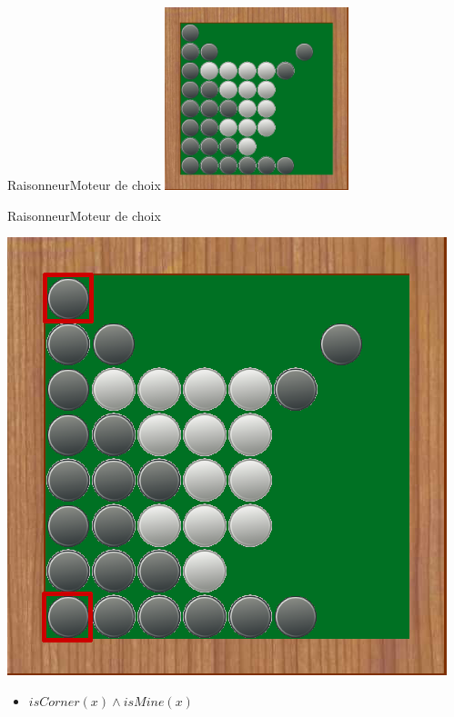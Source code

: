 \begin{frame}{Raisonneur}{Moteur de choix}
	\includegraphics[width=0.4\textwidth]{img/screenshoot/raisonneur_choix_0}	
\end{frame}

\begin{frame}{Raisonneur}{Moteur de choix}
	\begin{minipage}{0.45\textwidth}
		\includegraphics[width=\textwidth]{img/screenshoot/raisonneur_choix_1}
	\end{minipage}
	\begin{minipage}{0.50\textwidth}
		\begin{itemize}
			\item $isCorner(x) \wedge isMine(x)$
		\end{itemize}
	\end{minipage}
\end{frame}

